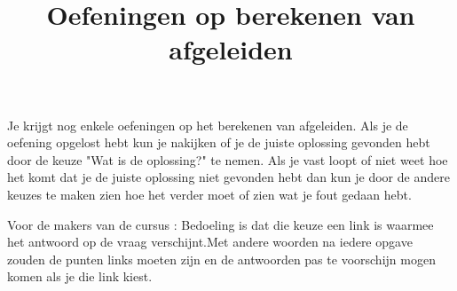 \documentclass{article}
\title{Oefeningen op berekenen van afgeleiden}
\date { }
\begin{document}
Je krijgt nog enkele oefeningen op het berekenen van afgeleiden.
Als je de oefening opgelost hebt kun je nakijken of je de juiste oplossing gevonden hebt door de keuze "Wat is de oplossing?" te nemen.
Als je vast loopt of niet weet hoe het komt dat je de juiste oplossing niet gevonden hebt dan kun je door de andere keuzes te maken zien hoe het verder moet of zien wat je fout gedaan hebt. 

\vspace {3mm}

Voor de makers van de cursus : Bedoeling is dat die keuze een link is waarmee het antwoord op de vraag verschijnt.Met andere woorden na iedere opgave zouden de punten links moeten zijn en de antwoorden pas te voorschijn mogen komen als je die link kiest.

\vspace{2mm}
\end{document}
